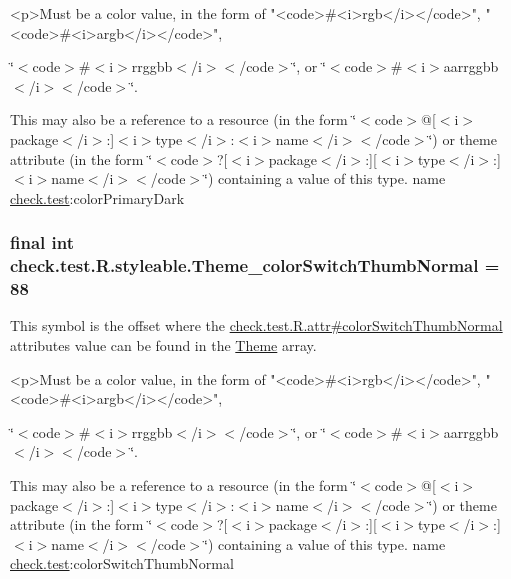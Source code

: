 \begin{DoxyVerb}      <p>Must be a color value, in the form of "<code>#<i>rgb</i></code>", "<code>#<i>argb</i></code>",
\end{DoxyVerb}
 \char`\"{}$<$code$>$\#$<$i$>$rrggbb$<$/i$>$$<$/code$>$\char`\"{}, or \char`\"{}$<$code$>$\#$<$i$>$aarrggbb$<$/i$>$$<$/code$>$\char`\"{}. 

This may also be a reference to a resource (in the form \char`\"{}$<$code$>$@\mbox{[}$<$i$>$package$<$/i$>$\+:\mbox{]}$<$i$>$type$<$/i$>$\+:$<$i$>$name$<$/i$>$$<$/code$>$\char`\"{}) or theme attribute (in the form \char`\"{}$<$code$>$?\mbox{[}$<$i$>$package$<$/i$>$\+:\mbox{]}\mbox{[}$<$i$>$type$<$/i$>$\+:\mbox{]}$<$i$>$name$<$/i$>$$<$/code$>$\char`\"{}) containing a value of this type.  name \hyperlink{namespacecheck_1_1test}{check.\+test}\+:color\+Primary\+Dark \hypertarget{classcheck_1_1test_1_1_r_1_1styleable_a0380932431c2ed2292807679db341649}{}
\subsubsection[{Theme\+\_\+color\+Switch\+Thumb\+Normal}]{\setlength{\rightskip}{0pt plus 5cm}final int check.\+test.\+R.\+styleable.\+Theme\+\_\+color\+Switch\+Thumb\+Normal = 88\hspace{0.3cm}{\ttfamily [static]}}\label{classcheck_1_1test_1_1_r_1_1styleable_a0380932431c2ed2292807679db341649}
This symbol is the offset where the \hyperlink{classcheck_1_1test_1_1_r_1_1attr_a97c7cb59a0e732bdf75408a5029196c7}{check.\+test.\+R.\+attr\#color\+Switch\+Thumb\+Normal} attribute\textquotesingle{}s value can be found in the \hyperlink{classcheck_1_1test_1_1_r_1_1styleable_acca726d02016a0cf607782ec3a436a81}{Theme} array.

\begin{DoxyVerb}      <p>Must be a color value, in the form of "<code>#<i>rgb</i></code>", "<code>#<i>argb</i></code>",
\end{DoxyVerb}
 \char`\"{}$<$code$>$\#$<$i$>$rrggbb$<$/i$>$$<$/code$>$\char`\"{}, or \char`\"{}$<$code$>$\#$<$i$>$aarrggbb$<$/i$>$$<$/code$>$\char`\"{}. 

This may also be a reference to a resource (in the form \char`\"{}$<$code$>$@\mbox{[}$<$i$>$package$<$/i$>$\+:\mbox{]}$<$i$>$type$<$/i$>$\+:$<$i$>$name$<$/i$>$$<$/code$>$\char`\"{}) or theme attribute (in the form \char`\"{}$<$code$>$?\mbox{[}$<$i$>$package$<$/i$>$\+:\mbox{]}\mbox{[}$<$i$>$type$<$/i$>$\+:\mbox{]}$<$i$>$name$<$/i$>$$<$/code$>$\char`\"{}) containing a value of this type.  name \hyperlink{namespacecheck_1_1test}{check.\+test}\+:color\+Switch\+Thumb\+Normal \hypertarget{classcheck_1_1test_1_1_r_1_1styleable_a8b78be6b3ea5c1a175341e08d853b1bd}{}
